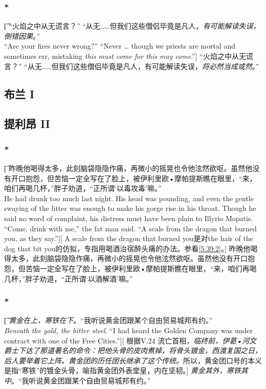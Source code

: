 \documentclass[12pt,a4paper]{article}
\begin{document}
\subsubsection{\color{red}*}\t[	
	“火焰之中从无谎言？” “从无……但我们这些僧侣毕竟是凡人，\emph{有可能解读失误，倒错因果}。”\\
	“Are your fires never wrong?” “Never … though we priests are mortal and sometimes err, mistaking \emph{this must come for this may come}.”]
	“火焰之中从无谎言？” “从无……但我们这些僧侣毕竟是凡人，有可能解读失误，\emph{将必然当成或然}。”
	

\subsection{布兰 I}

\subsection{提利昂 II}
\subsubsection{\color{red}*}\label{5.5.1}\t[
	昨晚他喝得太多，此刻脑袋隐隐作痛，再微小的摇晃也令他泫然欲呕。虽然他没有开口抱怨，但苦恼一定全写在了脸上，被伊利里欧•摩帕提斯瞧在眼里，“来，咱们再喝几杯，”胖子劝道，“正所谓‘以毒攻毒’嘛。”\\
	He had drunk too much last night. His head was pounding, and even the gentle swaying of the litter was enough to make his gorge rise in his throat. Though he said no word of complaint, his distress must have been plain to Illyrio Mopatis. “Come, drink with me,” the fat man said. “A scale from the dragon that burned you, as they say.”][
	A scale from the dragon that burned you是对the hair of the dog that bit you的仿拟，专指用喝酒治宿醉头痛的办法。参看\ref{5.39.2}。]
	昨晚他喝得太多，此刻脑袋隐隐作痛，再微小的摇晃也令他泫然欲呕。虽然他没有开口抱怨，但苦恼一定全写在了脸上，被伊利里欧•摩帕提斯瞧在眼里，“来，咱们再喝几杯，”胖子劝道，“正所谓‘以酒解酒’嘛。”

\subsubsection{\color{red}*}\t[	
	\emph{黄金在上，寒铁在下}。“我听说黄金团跟某个自由贸易城邦有约。”\\
	\emph{Beneath the gold, the bitter steel}. “I had heard the Golden Company was under contract with one of the Free Cities.”][
	根据V.24 流亡首相，\emph{临终前，伊葛•河文爵士下达了那道著名的命令：把他头骨的皮肉煮掉，将骨头镀金，西渡复国之日，后人要举着它上阵。黄金团的历任团长继承了这个传统。}所以，黄金团口号的本义是指“寒铁”的镀金头骨，喻指黄金团外表堂皇，内在坚韧。]
	\emph{黄金其外，寒铁其中}。“我听说黄金团跟某个自由贸易城邦有约。”
		
\end{document}
